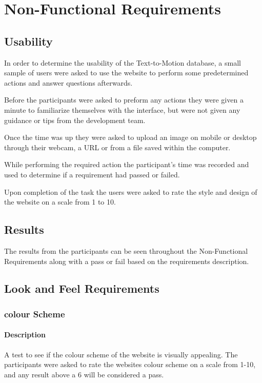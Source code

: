 \documentclass{scrreprt}
\begin{document}
\chapter{Non-Functional Requirements}
\section{Usability}

In order to determine the usability of the Text-to-Motion database, a small
sample of users were asked to use the website to perform some predetermined
actions and answer questions afterwards.

Before the participants were asked to preform any actions they were given a
minute to familiarize themselves with the interface, but were not given any
guidance or tips from the development team.

Once the time was up they were asked to upload an image on mobile or desktop
through their webcam, a URL or from a file saved within the computer.

While performing the required action the participant's time was recorded and
used to determine if a requirement had passed or failed.

Upon completion of the task the users were asked to rate the style and design
of the website on a scale from 1 to 10.

\section{Results}

The results from the participants can be seen throughout the Non-Functional
Requirements along with a pass or fail based on the requirements description.

\section{Look and Feel Requirements}
\subsection{colour Scheme}
\subsubsection{Description}

A test to see if the colour scheme of the website is visually appealing. The
participants were asked to rate the websites colour scheme on a scale from
1-10, and any result above a 6 will be considered a pass.
\end{document}
